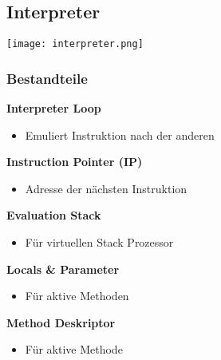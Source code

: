 \subsection{Interpreter}
\texttt{[image: interpreter.png]}
\subsubsection{Bestandteile}
\textbf{Interpreter Loop}
\begin{itemize}
    \item Emuliert Instruktion nach der anderen
\end{itemize}
\textbf{Instruction Pointer (IP)}
\begin{itemize}
    \item Adresse der nächsten Instruktion
\end{itemize}
\textbf{Evaluation Stack}
\begin{itemize}
    \item Für virtuellen Stack Prozessor
\end{itemize}
\textbf{Locals \& Parameter}
\begin{itemize}
    \item Für aktive Methoden
\end{itemize}
\textbf{Method Deskriptor}
\begin{itemize}
    \item Für aktive Methode
\end{itemize}

